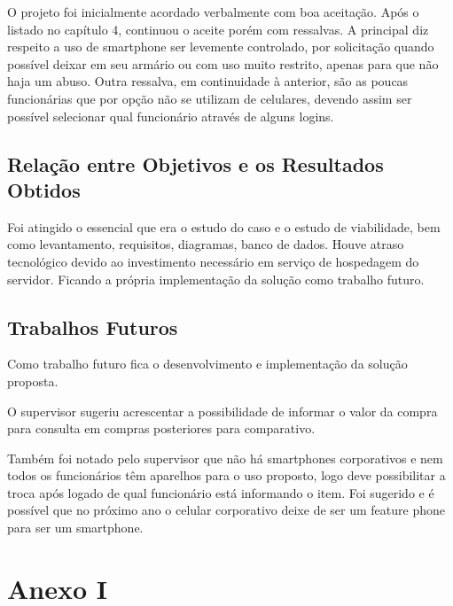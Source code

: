 \documentclass[
	12pt,
	openright,
	oneside, %
	a4paper,
	chapter=TITLE,
	section=TITLE,
	english,
	brazil %
	]{abntex2-udesc}
\begin{document}
O projeto foi inicialmente acordado verbalmente com boa aceitação. Após o listado no capítulo 4, continuou o aceite porém com ressalvas. A principal diz respeito a uso de smartphone ser levemente controlado, por solicitação quando possível deixar em seu armário ou com uso muito restrito, apenas para que não haja um abuso. Outra ressalva, em continuidade à anterior, são as poucas funcionárias que por opção não se utilizam de celulares, devendo assim ser possível selecionar qual funcionário através de alguns logins.

\section{Relação entre Objetivos e os Resultados Obtidos}

Foi atingido o essencial que era o estudo do caso e o estudo de viabilidade, bem como levantamento, requisitos, diagramas, banco de dados.
Houve atraso tecnológico devido ao investimento necessário em serviço de hospedagem do servidor. Ficando a própria implementação da solução como trabalho futuro.

\section{Trabalhos Futuros}

Como trabalho futuro fica o desenvolvimento e implementação da solução proposta.

O supervisor sugeriu acrescentar a possibilidade de informar o valor da compra para consulta em compras posteriores para comparativo.

Também foi notado pelo supervisor que não há smartphones corporativos e nem todos os funcionários têm aparelhos para o uso proposto, logo deve possibilitar a troca após logado de qual funcionário está informando o item. Foi sugerido e é possível que no próximo ano o celular corporativo deixe de ser um feature phone para ser um smartphone.

\postextual




\appendix
\chapter{Anexo I}

\end{document}
